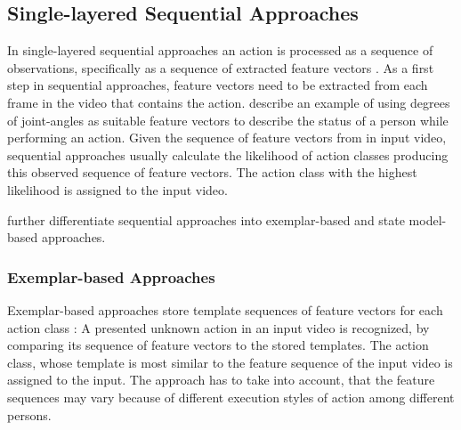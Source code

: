 %


\subsection{Single-layered Sequential Approaches}
In single-layered sequential approaches an action is processed as a sequence of observations, specifically as a sequence of extracted feature vectors \cite{aggarwal_human_2011}.
As a first step in sequential approaches, feature vectors need to be extracted from each frame in the video that contains the action.
\textcite{aggarwal_human_2011} describe an example of using degrees of joint-angles as suitable feature vectors to describe the status of a person while performing an action.
Given the sequence of feature vectors from in input video, sequential approaches usually calculate the likelihood of action classes producing this observed sequence of feature vectors.
The action class with the highest likelihood is assigned to the input video.

\textcite{aggarwal_human_2011} further differentiate sequential approaches into exemplar-based and state model-based approaches.


\subsubsection{Exemplar-based Approaches}
Exemplar-based approaches store template sequences of feature vectors for each action class \cite{aggarwal_human_2011}:
A presented unknown action in an input video is recognized, by comparing its sequence of feature vectors to the stored templates.
The action class, whose template is most similar to the feature sequence of the input video is assigned to the input.
The approach has to take into account, that the feature sequences may vary because of different execution styles of action among different persons.

